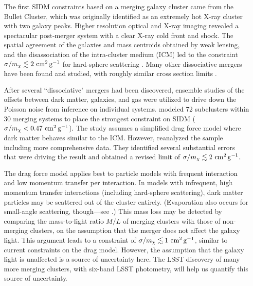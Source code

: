 
The first SIDM constraints based on a merging galaxy cluster came from the Bullet Cluster, which was originally identified as an extremely hot X-ray cluster with two galaxy peaks. Higher resolution optical and X-ray imaging revealed a spectacular post-merger system with a clear X-ray cold front and shock. The spatial agreement of the galaxies and mass centroids obtained by weak lensing, and the disassociation of the intra-cluster medium (ICM) led to the constraint $\sigma/m_\chi \lesssim 2 \mathrm{\,\mathrm{\,cm}^2\mathrm{\,g}^{-1}}$ for hard-sphere scattering \citep{Markevitch2004,Randall:2007ph,2017MNRAS.465..569R,Robertson:2016qef}. Many other dissociative mergers have been found and studied, with roughly similar cross section limits \citep[but with greater systematic uncertainty, \eg][]{bradac2008}. 

After several ``dissociative" mergers had been discovered, ensemble studies of the offsets between dark matter, galaxies, and gas were utilized to drive down the Poisson noise from inference on individual systems. \citet{Harvey:2015hha} modeled 72 subclusters within 30 merging systems to place the strongest constraint on SIDM ($\sigma/m_\chi<0.47 \mathrm{\,\mathrm{\,cm}^2\mathrm{\,g}^{-1}}$).
The study assumes a simplified drag force model where dark matter behaves similar to the ICM. However, \citet{Wittman:2017gxn} reanalyzed the sample including more comprehensive data. They identified several substantial errors that were driving the result and obtained a revised limit of $\sigma/m_\chi \lesssim 2\mathrm{\,\mathrm{\,cm}^2\mathrm{\,g}^{-1}}$.

The drag force model applies best to particle models with frequent interaction and low momentum transfer per interaction. In models with infrequent, high momentum transfer interactions (including hard-sphere scattering), dark matter particles may be scattered out of the cluster entirely. (Evaporation also occurs for small-angle scattering, though---see \citealt{Kahlhoefer:2013dca}.) This mass loss may be detected by comparing the mass-to-light ratio $M/L$ of merging clusters with those of non-merging clusters, on the assumption that the merger does not affect the galaxy light. This argument leads to a constraint of $\sigma/m_\chi \lesssim 1 \mathrm{\,\mathrm{\,cm}^2\mathrm{\,g}^{-1}}$, similar to current constraints on the drag model. However, the assumption that the galaxy light is unaffected is a source of uncertainty here. The LSST discovery of many more merging clusters, with six-band LSST photometry, will help us quantify this source of uncertainty. 


